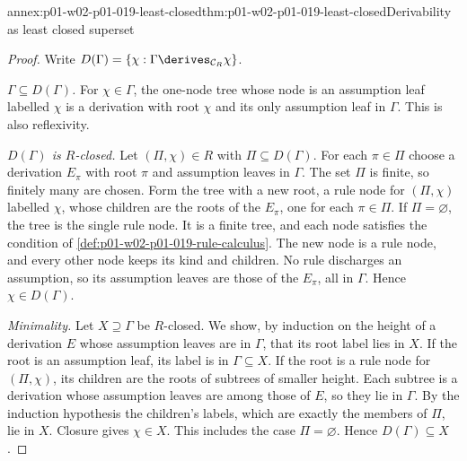 \begin{annexitem}{annex:p01-w02-p01-019-least-closed}{thm:p01-w02-p01-019-least-closed}{Derivability as least closed superset}
\begin{proof}
Write \(D(\Gamma)=\{\chi:\Gamma\derives_{\mathcal C_R}\chi\}\).

\emph{\(\Gamma\subseteq D(\Gamma)\).} For \(\chi\in\Gamma\), the one-node tree
whose node is an assumption leaf labelled \(\chi\) is a derivation with root
\(\chi\) and its only assumption leaf in \(\Gamma\). This is also
reflexivity.

\emph{\(D(\Gamma)\) is \(R\)-closed.} Let \((\Pi,\chi)\in R\) with
\(\Pi\subseteq D(\Gamma)\). For each \(\pi\in\Pi\) choose a derivation
\(E_\pi\) with root \(\pi\) and assumption leaves in \(\Gamma\). The set
\(\Pi\) is finite, so finitely many are chosen. Form the tree with a new root,
a rule node for \((\Pi,\chi)\) labelled \(\chi\), whose children are the roots
of the \(E_\pi\), one for each \(\pi\in\Pi\). If \(\Pi=\varnothing\), the tree
is the single rule node. It is a finite tree, and each node satisfies the
condition of \cref{def:p01-w02-p01-019-rule-calculus}. The new node is a rule
node, and every other node keeps its kind and children. No rule discharges an
assumption, so its assumption leaves are those of the \(E_\pi\), all in
\(\Gamma\). Hence \(\chi\in D(\Gamma)\).

\emph{Minimality.} Let \(X\supseteq\Gamma\) be \(R\)-closed. We show, by
induction on the height of a derivation \(E\) whose assumption leaves are in
\(\Gamma\), that its root label lies in \(X\). If the root is an assumption
leaf, its label is in \(\Gamma\subseteq X\). If the root is a rule node for
\((\Pi,\chi)\), its children are the roots of subtrees of smaller height. Each
subtree is a derivation whose assumption leaves are among those of \(E\), so
they lie in \(\Gamma\). By the induction hypothesis the children's labels,
which are exactly the members of \(\Pi\), lie in \(X\). Closure gives
\(\chi\in X\). This includes the case \(\Pi=\varnothing\). Hence
\(D(\Gamma)\subseteq X\).
\end{proof}
\end{annexitem}

